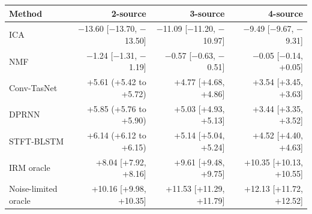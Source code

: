 \begin{tabular}{lrrr}
\toprule
Method & 2-source & 3-source & 4-source \\
\midrule
ICA & $-$13.60 [$-$13.70, $-$13.50] & $-$11.09 [$-$11.20, $-$10.97] & $-$9.49 [$-$9.67, $-$9.31] \\
NMF & $-$1.24 [$-$1.31, $-$1.19] & $-$0.57 [$-$0.63, $-$0.51] & $-$0.05 [$-$0.14, +0.05] \\
Conv-TasNet & +5.61 (+5.42 to +5.72) & +4.77 [+4.68, +4.86] & +3.54 [+3.45, +3.63] \\
DPRNN & +5.85 (+5.76 to +5.90) & +5.03 [+4.93, +5.13] & +3.44 [+3.35, +3.52] \\
STFT-BLSTM & +6.14 (+6.12 to +6.15) & +5.14 [+5.04, +5.24] & +4.52 [+4.40, +4.63] \\
\midrule
IRM oracle & +8.04 [+7.92, +8.16] & +9.61 [+9.48, +9.75] & +10.35 [+10.13, +10.55] \\
Noise-limited oracle & +10.16 [+9.98, +10.35] & +11.53 [+11.29, +11.79] & +12.13 [+11.72, +12.52] \\
\bottomrule
\end{tabular}
